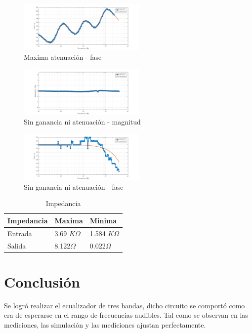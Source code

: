 \documentclass[../../tc_tp3_main.tex]{subfiles}
\begin{document}
\begin{figure}[H]
\centering
\includegraphics[width=0.55\textwidth]{imagenes/min_f.png}
\caption{Maxima atenuación - fase} 
\end{figure}

\begin{figure}[H]
\centering
\includegraphics[width=0.55\textwidth]{imagenes/med_m.png}
\caption{Sin ganancia ni atenuación - magnitud} 
\end{figure}

\begin{figure}[H]
\centering
\includegraphics[width=0.55\textwidth]{imagenes/med_f.png}
\caption{Sin ganancia ni atenuación - fase} 
\end{figure}

\begin{table}[h]
\begin{center}
\begin{tabular}{|l|l|l|}
\hline
Impedancia & Maxima & Minima \\
\hline \hline
Entrada& 3.69 $K \Omega$  &1.584 $K \Omega$ \\ \hline
Salida&8.122$\Omega$  &0.022$\Omega$  \\ \hline


\end{tabular}
\caption{Impedancia} 
\label{tab:MImp}
\end{center}
\end{table}
\section{Conclusión}
Se logró realizar el ecualizador de tres bandas, dicho circuito se comportó como era de esperarse en el rango de frecuencias audibles. Tal como se observan en las mediciones, las simulación y las mediciones ajustan perfectamente.
\end{document}
